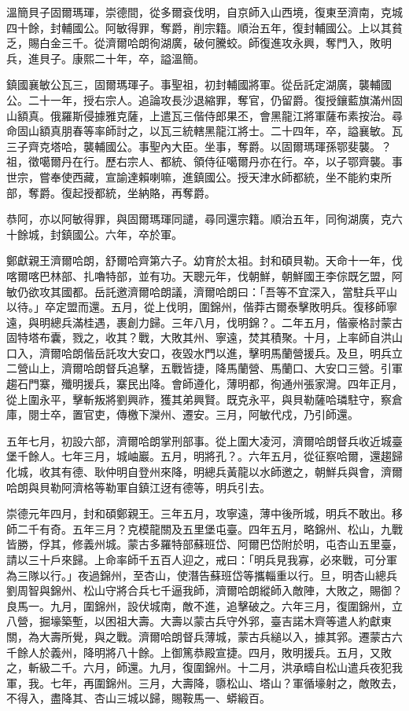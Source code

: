 \begin{pinyinscope}
溫簡貝子固爾瑪琿，崇德間，從多爾袞伐明，自京師入山西境，復東至濟南，克城四十餘，封輔國公。阿敏得罪，奪爵，削宗籍。順治五年，復封輔國公。上以其貧乏，賜白金三千。從濟爾哈朗徇湖廣，破何騰蛟。師復進攻永興，奪門入，敗明兵，進貝子。康熙二十年，卒，謚溫簡。

鎮國襄敏公瓦三，固爾瑪琿子。事聖祖，初封輔國將軍。從岳託定湖廣，襲輔國公。二十一年，授右宗人。追論攻長沙退縮罪，奪官，仍留爵。復授鑲藍旗滿州固山額真。俄羅斯侵據雅克薩，上遣瓦三偕侍郎果丕，會黑龍江將軍薩布素按治。尋命固山額真朋春等率師討之，以瓦三統轄黑龍江將士。二十四年，卒，謚襄敏。瓦三子齊克塔哈，襲輔國公。事聖內大臣。坐事，奪爵。以固爾瑪琿孫鄂斐襲。？祖，徵噶爾丹在行。歷右宗人、都統、領侍征噶爾丹亦在行。卒，以子鄂齊襲。事世宗，嘗奉使西藏，宣諭達賴喇嘛，進鎮國公。授天津水師都統，坐不能約束所部，奪爵。復起授都統，坐納賂，再奪爵。

恭阿，亦以阿敏得罪，與固爾瑪琿同譴，尋同還宗籍。順治五年，同徇湖廣，克六十餘城，封鎮國公。六年，卒於軍。

鄭獻親王濟爾哈朗，舒爾哈齊第六子。幼育於太祖。封和碩貝勒。天命十一年，伐喀爾喀巴林部、扎嚕特部，並有功。天聰元年，伐朝鮮，朝鮮國王李倧既乞盟，阿敏仍欲攻其國都。岳託邀濟爾哈朗議，濟爾哈朗曰：「吾等不宜深入，當駐兵平山以待。」卒定盟而還。五月，從上伐明，圍錦州，偕莽古爾泰擊敗明兵。復移師寧遠，與明總兵滿桂遇，裹創力歸。三年八月，伐明錦？。二年五月，偕豪格討蒙古固特塔布囊，戮之，收其？戰，大敗其州、寧遠，焚其積聚。十月，上率師自洪山口入，濟爾哈朗偕岳託攻大安口，夜毀水門以進，擊明馬蘭營援兵。及旦，明兵立二營山上，濟爾哈朗督兵追擊，五戰皆捷，降馬蘭營、馬蘭口、大安口三營。引軍趨石門寨，殲明援兵，寨民出降。會師遵化，薄明都，徇通州張家灣。四年正月，從上圍永平，擊斬叛將劉興祚，獲其弟興賢。既克永平，與貝勒薩哈璘駐守，察倉庫，閱士卒，置官吏，傳檄下灤州、遷安。三月，阿敏代戍，乃引師還。

五年七月，初設六部，濟爾哈朗掌刑部事。從上圍大凌河，濟爾哈朗督兵收近城臺堡千餘人。七年三月，城岫巖。五月，明將孔？。六年五月，從征察哈爾，還趨歸化城，收其有德、耿仲明自登州來降，明總兵黃龍以水師邀之，朝鮮兵與會，濟爾哈朗與貝勒阿濟格等勒軍自鎮江迓有德等，明兵引去。

崇德元年四月，封和碩鄭親王。三年五月，攻寧遠，薄中後所城，明兵不敢出。移師二千有奇。五年三月？克模龍關及五里堡屯臺。四年五月，略錦州、松山，九戰皆勝，俘其，修義州城。蒙古多羅特部蘇班岱、阿爾巴岱附於明，屯杏山五里臺，請以三十戶來歸。上命率師千五百人迎之，戒曰：「明兵見我寡，必來戰，可分軍為三隊以行。」夜過錦州，至杏山，使潛告蘇班岱等攜輜重以行。旦，明杏山總兵劉周智與錦州、松山守將合兵七千逼我師，濟爾哈朗縱師入敵陣，大敗之，賜御？良馬一。九月，圍錦州，設伏城南，敵不進，追擊破之。六年三月，復圍錦州，立八營，掘壕築塹，以困祖大壽。大壽以蒙古兵守外郛，臺吉諾木齊等遣人約獻東關，為大壽所覺，與之戰。濟爾哈朗督兵薄城，蒙古兵縋以入，據其郛。遷蒙古六千餘人於義州，降明將八十餘。上御篤恭殿宣捷。四月，敗明援兵。五月，又敗之，斬級二千。六月，師還。九月，復圍錦州。十二月，洪承疇自松山遣兵夜犯我軍，我。七年，再圍錦州。三月，大壽降，隳松山、塔山？軍循壕射之，敵敗去，不得入，盡降其、杏山三城以歸，賜鞍馬一、蟒緞百。


\end{pinyinscope}
